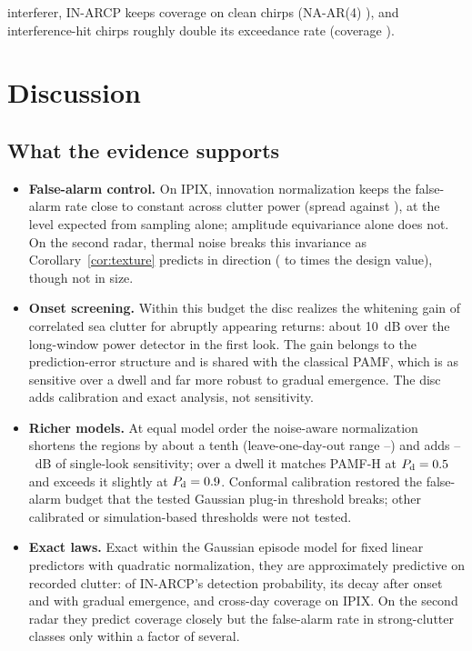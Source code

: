 \documentclass[journal]{IEEEtran}
\begin{document}
interferer, IN-ARCP keeps \JFourIN{} coverage on clean chirps (NA-AR(4) \JFourNAFour), and interference-hit chirps roughly double its exceedance rate (coverage \JFourHit).

\section{Discussion}
\subsection{What the evidence supports}
\begin{itemize}[leftmargin=*,itemsep=1pt]
\item \textbf{False-alarm control.} On IPIX, innovation normalization keeps the false-alarm rate close to constant across clutter power (spread \QPfaINSpread{} against \QPfaUSpread), at the level expected from sampling alone; amplitude equivariance alone does not. On the second radar, thermal noise breaks this invariance as Corollary~\ref{cor:texture} predicts in direction (\JPfaRatioLow{} to \JPfaRatioHigh{} times the design value), though not in size.
\item \textbf{Onset screening.} Within this budget the disc realizes the whitening gain of correlated sea clutter for abruptly appearing returns: about 10~dB over the long-window power detector in the first look. The gain belongs to the prediction-error structure and is shared with the classical PAMF, which is as sensitive over a dwell and far more robust to gradual emergence. The disc adds calibration and exact analysis, not sensitivity.
\item \textbf{Richer models.} At equal model order the noise-aware normalization shortens the regions by about a tenth (leave-one-day-out range \LodoSameLo--\LodoSameHi) and adds \NAvsINFourHalf--\NAvsINFourNinety~dB of single-look sensitivity; over a dwell it matches PAMF-H at $P_{\rm d}=0.5$ and exceeds it slightly at $P_{\rm d}=0.9$. Conformal calibration restored the false-alarm budget that the tested Gaussian plug-in threshold breaks; other calibrated or simulation-based thresholds were not tested.
\item \textbf{Exact laws.} Exact within the Gaussian episode model for fixed linear predictors with quadratic normalization, they are approximately predictive on recorded clutter: of IN-ARCP's detection probability, its decay after onset and with gradual emergence, and cross-day coverage on IPIX. On the second radar they predict coverage closely but the false-alarm rate in strong-clutter classes only within a factor of several.
\end{itemize}
\end{document}
